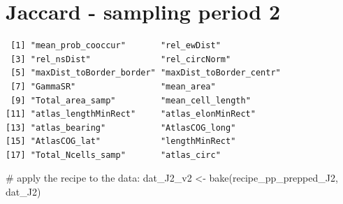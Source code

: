 \documentclass[
  letterpaper,
  DIV=11,
  numbers=noendperiod]{scrreprt}
\newenvironment{Shaded}{\begin{snugshade}}{\end{snugshade}}
\newcommand{\AttributeTok}[1]{\textcolor[rgb]{0.40,0.45,0.13}{#1}}
\newcommand{\CommentTok}[1]{\textcolor[rgb]{0.37,0.37,0.37}{#1}}
\newcommand{\DecValTok}[1]{\textcolor[rgb]{0.68,0.00,0.00}{#1}}
\newcommand{\FunctionTok}[1]{\textcolor[rgb]{0.28,0.35,0.67}{#1}}
\newcommand{\NormalTok}[1]{\textcolor[rgb]{0.00,0.23,0.31}{#1}}
\newcommand{\OtherTok}[1]{\textcolor[rgb]{0.00,0.23,0.31}{#1}}
\newcommand{\SpecialCharTok}[1]{\textcolor[rgb]{0.37,0.37,0.37}{#1}}
\begin{document}
\section{Jaccard - sampling period 2}

\begin{Shaded}
\end{Shaded}

\begin{verbatim}
 [1] "mean_prob_cooccur"       "rel_ewDist"             
 [3] "rel_nsDist"              "rel_circNorm"           
 [5] "maxDist_toBorder_border" "maxDist_toBorder_centr" 
 [7] "GammaSR"                 "mean_area"              
 [9] "Total_area_samp"         "mean_cell_length"       
[11] "atlas_lengthMinRect"     "atlas_elonMinRect"      
[13] "atlas_bearing"           "AtlasCOG_long"          
[15] "AtlasCOG_lat"            "lengthMinRect"          
[17] "Total_Ncells_samp"       "atlas_circ"             
\end{verbatim}

\begin{Shaded}
\begin{Highlighting}[]
\CommentTok{\# apply the recipe to the data:}
\NormalTok{dat\_J2\_v2 }\OtherTok{\textless{}{-}} \FunctionTok{bake}\NormalTok{(recipe\_pp\_prepped\_J2, dat\_J2)}
\end{Highlighting}
\end{Shaded}
\end{document}
